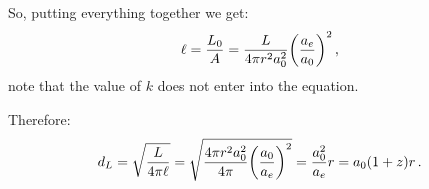 \documentclass[main.tex]{subfiles}
\begin{document}
So, putting everything together we get:
%
\begin{equation}
  \ell = \frac{L_0 }{A} 
  = \frac{L}{4 \pi r^2 a_0 ^2} \qty(\frac{a_e}{a_0}) ^2
  \,,
\end{equation}
%
note that the value of \(k\) does not enter into the equation.

Therefore:
%
\begin{equation} \label{eq:luminosity-distance}
d_L = \sqrt{\frac{L}{4 \pi \ell}}
= \sqrt{\frac{4 \pi r^2a_0^2}{4 \pi } \qty(\frac{a_0}{a_e})^2}
= \frac{a_0^2}{a_e} r = a_0  (1+z) r\,.
\end{equation}
\end{document}

